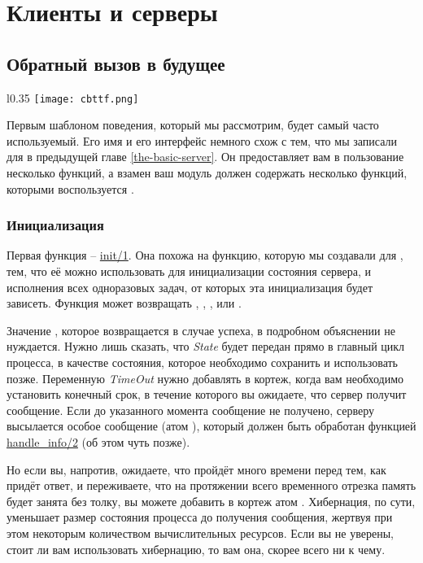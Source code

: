 \chapter{Клиенты и серверы}
\label{clients-and-servers}
\section{Обратный вызов в будущее}
\label{callback-to-the-future}
\begin{wrapfigure}{l}{0.35\linewidth}
    \texttt{[image: cbttf.png]}
\end{wrapfigure}
Первым шаблоном поведения, который мы рассмотрим, будет самый часто используемый.
Его имя  и его интерфейс немного схож с тем, что мы записали для  в предыдущей главе \ref{the-basic-server}. Он предоставляет вам в пользование несколько функций, а взамен ваш модуль должен содержать несколько функций, которыми воспользуется .
\subsection{Инициализация}
\label{init}
Первая функция \--- \href{http://erldocs.com/R15B/stdlib/gen\_server.html#init/1}{init/1}.
Она похожа на функцию, которую мы создавали  для , тем, что её можно использовать для инициализации состояния сервера, и исполнения всех одноразовых задач, от которых эта инициализация будет зависеть.
Функция может возвращать , , ,  или .

Значение , которое возвращается в случае успеха, в подробном объяснении не нуждается.
Нужно лишь сказать, что \emph{State} будет передан прямо в главный цикл процесса, в качестве состояния, которое необходимо сохранить и использовать позже.
Переменную \emph{TimeOut} нужно добавлять в кортеж, когда вам необходимо установить конечный срок, в течение которого вы ожидаете, что сервер получит сообщение.
Если до указанного момента сообщение не получено, серверу высылается особое сообщение (атом ), который должен быть обработан функцией \href{http://erldocs.com/R15B/stdlib/gen\_server.html#handle\_info/2}{handle\_info/2} (об этом чуть позже).

Но если вы, напротив, ожидаете, что пройдёт много времени перед тем, как придёт ответ, и переживаете, что на протяжении всего временного отрезка память будет занята без толку, вы можете добавить в кортеж атом .
Хибернация, по сути, уменьшает размер состояния процесса до получения сообщения, жертвуя при этом некоторым количеством вычислительных ресурсов.
Если вы не уверены, стоит ли вам использовать хибернацию, то вам она, скорее всего ни к чему.

